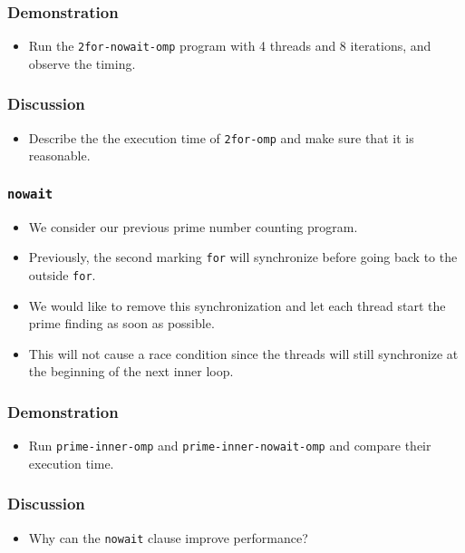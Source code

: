 \documentclass{beamer}
\begin{document}
\begin{frame}
  \frametitle{Demonstration}
  \begin{itemize}
  \item Run the {\tt 2for-nowait-omp} program with 4 threads and 8
    iterations, and observe the timing.
  \end{itemize}
\end{frame}

\begin{frame}
  \frametitle{Discussion}
  \begin{itemize}
  \item Describe the the execution time of {\tt 2for-omp} and make
    sure that it is reasonable.
  \end{itemize}
\end{frame}

\begin{frame}
\frametitle{\tt nowait}
\begin{itemize}
\item We consider our previous prime number counting program.
\item Previously, the second marking {\tt for} will synchronize before going back to the outside {\tt for}.
\item We would like to remove this synchronization and let each thread start the prime finding as soon as possible.
\item This will not cause a race condition since the threads will still synchronize at the beginning of the next inner loop.
\end{itemize}
\end{frame}

\begin{frame}
\end{frame}

\begin{frame}
  \frametitle{Demonstration}
  \begin{itemize}
  \item Run {\tt prime-inner-omp} and {\tt prime-inner-nowait-omp} and
    compare their execution time.
  \end{itemize}
\end{frame}

\begin{frame}
  \frametitle{Discussion}
  \begin{itemize}
  \item Why can the {\tt nowait} clause improve performance?
  \end{itemize}
\end{frame}
\end{document}
